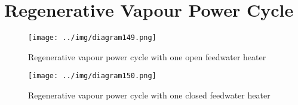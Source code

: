 \documentclass[class=report, crop=false, 12pt,a4paper]{standalone}
\numberwithin{equation}{section}
\begin{document}
\section{Regenerative Vapour Power Cycle}
\begin{figure}[H]
  \centering
  \texttt{[image: ../img/diagram149.png]}
  \caption{Regenerative vapour power cycle with one open feedwater heater}
\end{figure}
\begin{figure}[H]
  \centering
  \texttt{[image: ../img/diagram150.png]}
  \caption{Regenerative vapour power cycle with one closed feedwater heater}
\end{figure}
\end{document}
